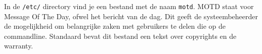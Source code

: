 In de \texttt{/etc/} directory vind je een bestand met de naam \texttt{motd}. MOTD staat voor Message Of The Day, ofwel het bericht van de dag. Dit geeft de systeembeheerder de mogelijkheid om belangrijke zaken met gebruikers te delen die op de commandline. Standaard bevat dit bestand een tekst over copyrights en de warranty.

